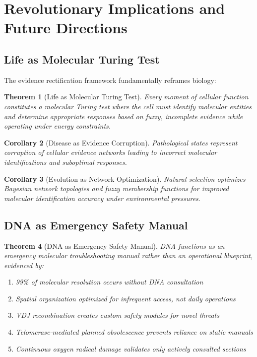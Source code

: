 \documentclass[12pt,a4paper]{article}
\newtheorem{theorem}{Theorem}[section]
\newtheorem{corollary}[theorem]{Corollary}
\begin{document}
\section{Revolutionary Implications and Future Directions}

\subsection{Life as Molecular Turing Test}

The evidence rectification framework fundamentally reframes biology:

\begin{theorem}[Life as Molecular Turing Test]
Every moment of cellular function constitutes a molecular Turing test where the cell must identify molecular entities and determine appropriate responses based on fuzzy, incomplete evidence while operating under energy constraints.
\end{theorem}

\begin{corollary}[Disease as Evidence Corruption]
Pathological states represent corruption of cellular evidence networks leading to incorrect molecular identifications and suboptimal responses.
\end{corollary}

\begin{corollary}[Evolution as Network Optimization]
Natural selection optimizes Bayesian network topologies and fuzzy membership functions for improved molecular identification accuracy under environmental pressures.
\end{corollary}

\subsection{DNA as Emergency Safety Manual}

\begin{theorem}[DNA as Emergency Safety Manual]
DNA functions as an emergency molecular troubleshooting manual rather than an operational blueprint, evidenced by:
\begin{enumerate}
\item 99\% of molecular resolution occurs without DNA consultation
\item Spatial organization optimized for infrequent access, not daily operations
\item VDJ recombination creates custom safety modules for novel threats
\item Telomerase-mediated planned obsolescence prevents reliance on static manuals
\item Continuous oxygen radical damage validates only actively consulted sections
\end{enumerate}
\end{theorem}
\end{document}
